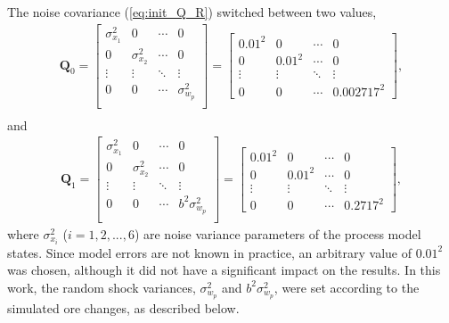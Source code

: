 The noise covariance (\ref{eq:init_Q_R}) switched between two values,
\begin{equation} \label{eq:Q0}
	\begin{aligned}
		\mathbf{Q}_0=\begin{bmatrix}
			\sigma_{x_1}^2 & 0 & \cdots & 0 \\
			0 & \sigma_{x_2}^2 & \cdots & 0 \\
			\vdots & \vdots & \ddots & \vdots \\
			0 & 0 & \cdots & \sigma_{w_p}^2 \\
		\end{bmatrix}=\begin{bmatrix}
			0.01^2 & 0 & \cdots & 0 \\
			0 & 0.01^2 & \cdots & 0 \\
			\vdots & \vdots & \ddots & \vdots \\
			0 & 0 & \cdots & 0.002717^2
		\end{bmatrix}, \\
	\end{aligned}
\end{equation}
and 
\begin{equation} \label{eq:Q1}
	\begin{aligned}
		\mathbf{Q}_1=\begin{bmatrix}
			\sigma_{x_1}^2 & 0 & \cdots & 0 \\
			0 & \sigma_{x_2}^2 & \cdots & 0 \\
			\vdots & \vdots & \ddots & \vdots \\
			0 & 0 & \cdots & b^2\sigma_{w_p}^2 \\
		\end{bmatrix}=\begin{bmatrix}
			0.01^2 & 0 & \cdots & 0 \\
			0 & 0.01^2 & \cdots & 0 \\
			\vdots & \vdots & \ddots & \vdots \\
			0 & 0 & \cdots & 0.2717^2
		\end{bmatrix},
	\end{aligned}
\end{equation}
where $\sigma_{x_i}^2$ ($i=1,2,...,6$) are noise variance parameters of the process model states. Since model errors are not known in practice, an arbitrary value of  $0.01^2$ was chosen, although it did not have a significant impact on the results. In this work, the random shock variances, $\sigma_{w_p}^2$ and $b^2\sigma_{w_p}^2$, were set according to the simulated ore changes, as described below.

